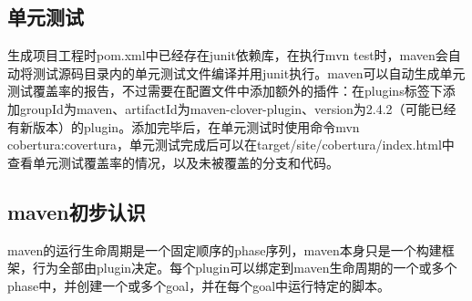 \documentclass[UTF8]{ctexart}
\begin{document}
    \subsection{单元测试} 生成项目工程时pom.xml中已经存在junit依赖库，在执行mvn test时，maven会自动将测试源码目录内的单元测试文件编译并用junit执行。maven可以自动生成单元测试覆盖率的报告，不过需要在配置文件中添加额外的插件：在plugins标签下添加groupId为maven、artifactId为maven-clover-plugin、version为2.4.2（可能已经有新版本）的plugin。添加完毕后，在单元测试时使用命令mvn cobertura:covertura，单元测试完成后可以在target/site/cobertura/index.html中查看单元测试覆盖率的情况，以及未被覆盖的分支和代码。
    \subsection{maven初步认识} maven的运行生命周期是一个固定顺序的phase序列，maven本身只是一个构建框架，行为全部由plugin决定。每个plugin可以绑定到maven生命周期的一个或多个phase中，并创建一个或多个goal，并在每个goal中运行特定的脚本。
\end{document}
